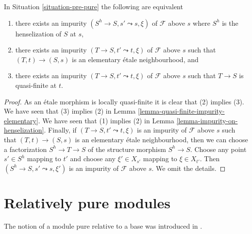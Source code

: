 \begin{lemma}
\label{lemma-pure-along-X-s}
In Situation \ref{situation-pre-pure} the following
are equivalent
\begin{enumerate}
\item there exists an impurity $(S^h \to S, s' \leadsto s, \xi)$
of $\mathcal{F}$ above $s$ where $S^h$ is the henselization of $S$ at $s$,
\item there exists an impurity $(T \to S, t' \leadsto t, \xi)$
of $\mathcal{F}$ above $s$ such that $(T, t) \to (S, s)$ is an
elementary \'etale neighbourhood, and
\item there exists an impurity $(T \to S, t' \leadsto t, \xi)$
of $\mathcal{F}$ above $s$ such that $T \to S$ is quasi-finite at $t$.
\end{enumerate}
\end{lemma}

\begin{proof}
As an \'etale morphism is locally quasi-finite it is clear that
(2) implies (3). We have seen that (3) implies (2) in
Lemma \ref{lemma-quasi-finite-impurity-elementary}.
We have seen that (1) implies (2) in
Lemma \ref{lemma-impurity-on-henselization}.
Finally, if $(T \to S, t' \leadsto t, \xi)$ is an impurity
of $\mathcal{F}$ above $s$ such that $(T, t) \to (S, s)$ is an
elementary \'etale neighbourhood, then we can choose a factorization
$S^h \to T \to S$ of the structure morphism $S^h \to S$.
Choose any point $s' \in S^h$ mapping to $t'$ and choose any
$\xi' \in X_{s'}$ mapping to $\xi \in X_{t'}$. Then
$(S^h \to S, s' \leadsto s, \xi')$ is an impurity of
$\mathcal{F}$ above $s$. We omit the details.
\end{proof}





\section{Relatively pure modules}
\label{section-pure}

\noindent
The notion of a module pure relative to a base was introduced in \cite{GruRay}.


